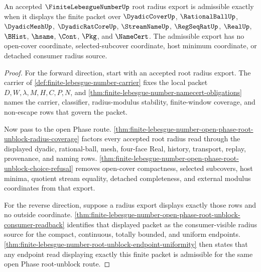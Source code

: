 \begin{theorem}
\label{thm:finite-lebesgue-number-root-radius-export-exactness}
An accepted $\FiniteLebesgueNumberUp$ root radius export is admissible exactly when it displays the finite packet over $\DyadicCoverUp$, $\RationalBallUp$, $\DyadicMeshUp$, $\DyadicRatCoreUp$, $\StreamNameUp$, $\RegSeqRatUp$, $\RealUp$, $\BHist$, $\hsame$, $\Cont$, $\Pkg$, and $\NameCert$. The admissible export has no open-cover coordinate, selected-subcover coordinate, host minimum coordinate, or detached consumer radius source.
\end{theorem}
\begin{proof}
For the forward direction, start with an accepted root radius export. The carrier of \autoref{def:finite-lebesgue-number-carrier} fixes the local packet $D,W,\lambda,M,H,C,P,N$, and \autoref{thm:finite-lebesgue-number-namecert-obligations} names the carrier, classifier, radius-modulus stability, finite-window coverage, and non-escape rows that govern the packet.

Now pass to the open Phase route. \autoref{thm:finite-lebesgue-number-open-phase-root-unblock-radius-coverage} factors every accepted root radius read through the displayed dyadic, rational-ball, mesh, four-face Real, history, transport, replay, provenance, and naming rows. \autoref{thm:finite-lebesgue-number-open-phase-root-unblock-choice-refusal} removes open-cover compactness, selected subcovers, host minima, quotient stream equality, detached completeness, and external modulus coordinates from that export.

For the reverse direction, suppose a radius export displays exactly those rows and no outside coordinate. \autoref{thm:finite-lebesgue-number-open-phase-root-unblock-consumer-readback} identifies that displayed packet as the consumer-visible radius source for the compact, continuous, totally bounded, and uniform endpoints. \autoref{thm:finite-lebesgue-number-root-unblock-endpoint-uniformity} then states that any endpoint read displaying exactly this finite packet is admissible for the same open Phase root-unblock route.
\end{proof}

